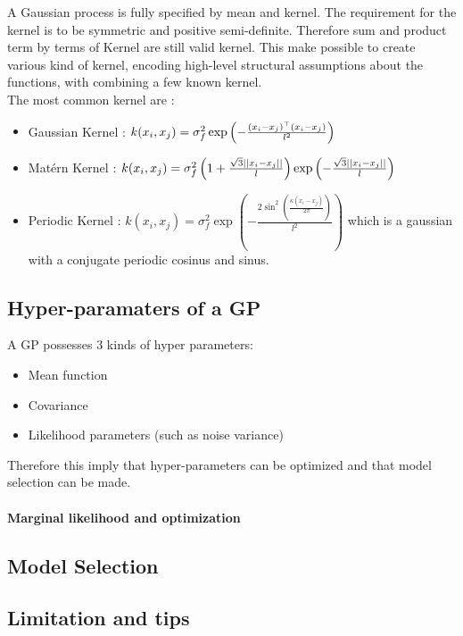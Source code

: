 				A Gaussian process is fully specified by mean and kernel. The requirement for the kernel is to be symmetric and positive semi-definite. Therefore sum and product term by terms of Kernel are still valid kernel. This make possible to create various kind of kernel, encoding high-level structural assumptions about the functions, with combining a few known kernel. \\
				The most common kernel are : 
				\begin{itemize}
					\item Gaussian Kernel : $k(x_i, x_j) = \sigma^2_f \exp\left(- \frac{(x_i -x_j)^\top (x_i - x_j)}{l^2}\right) $
					\item Matérn Kernel : $ k(x_i, x_j) = \sigma^2_f \left( 1 + \frac{\sqrt{3} \mid \mid x_i - x_j\mid \mid}{l}\right) \exp \left( - \frac{\sqrt{3} \mid \mid x_i - x_j\mid \mid}{l}\right)  $
					\item Periodic Kernel : $k(x_i, x_j) =  \sigma^2_f  \exp \left( - \frac{2 \sin^2\left( \frac{\kappa(x_i -x_j)}{2 \pi}\right)}{l^2}\right) $ which is a gaussian with a conjugate periodic cosinus and sinus.
				\end{itemize}

		\subsection{Hyper-paramaters of a GP}

				A GP possesses 3 kinds of hyper parameters:
				\begin{itemize}
					\item Mean function
					\item Covariance
					\item Likelihood parameters (such as noise variance)
				\end{itemize}
				Therefore this imply that hyper-parameters can be optimized and that model selection can be made. 

				\paragraph*{Marginal likelihood and optimization}

		\subsection{Model Selection}

		\subsection{Limitation and tips}

